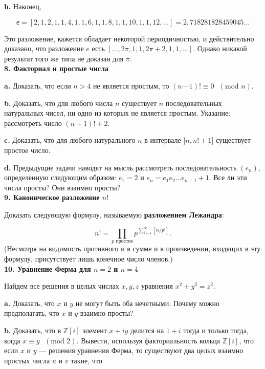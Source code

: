 \documentclass{mai_book}
\begin{document}
\textbf{h.} Наконец,

\[
е = [2,1,2,1,1,4,1,1,6,1,1,8,1,1,10,1,1,12,...] = 2,718 281828459045...
\]

\noindent Это разложение, кажется обладает некоторой периодичностью, и 
действительно доказано, что разложение $e$ есть $[...,2\pi,1,1,2\pi+2,1,1,...]$. Однако никакой результат того же типа не доказан для $\pi$.
\\

\noindent \textbf{8. Факториал и простые числа}

\textbf{a.} Доказать, что если $n > 4$ не является простым, то $(n — 1)! \equiv 0 \text{ } (\text{mod } n)$.

\textbf{b.} Доказать, что для любого числа $n$ существует $n$ 
последовательных натуральных чисел, ни одно из которых не является простым. 
Указание: рассмотреть число $(n + 1)! + 2$.

\textbf{c.} Доказать, что для любого натурального $n$ в интервале $]n, n! + 1]$ существует простое число.

\textbf{d.} Предыдущие задачи наводят на мысль рассмотреть 
последовательность $(e_n)$, определенную следующим образом: $e_1 = 2$ и
$e_n = e_1e_2...e_{n-1}+1$. Все ли эти числа просты? Они взаимно просты?
\\

\noindent \textbf{9. Каноническое разложение $n!$}

Доказать следующую формулу, называемую \textbf{разложением Лежандра}:

\[
n! = \prod_{p \text{ простое}} p^{\sum_{i=1}^\infty[n/p^i]}.
\]
(Несмотря на видимость противного и в сумме и в произведении, 
входящих в эту формулу, присутствует лишь конечное число членов.)
\\

\noindent \textbf{10. Уравнение Ферма для $n = 2$ и $n = 4$}

Найдем все решения в целых числах $x, y, z$ уравнения $x^2 + y^2 = z^2$.

\textbf{a.} Доказать, что $x$ и $y$ не могут быть оба нечетными. Почему можно
предполагать, что $x$ и $y$ взаимно просты?

\textbf{b.} Доказать, что в $\mathbb{Z}[i]$ элемент $x + iy$ делится на $1 + i$ тогда и только тогда, когда $x \equiv y \text{ } (\text{mod } 2)$. Вывести, используя факториальность кольца $\mathbb{Z}[i]$, что если $x$ и $y$ — решения уравнения Ферма, то существуют два целых взаимно простых числа $u$ и $v$ такие, что
\end{document}
